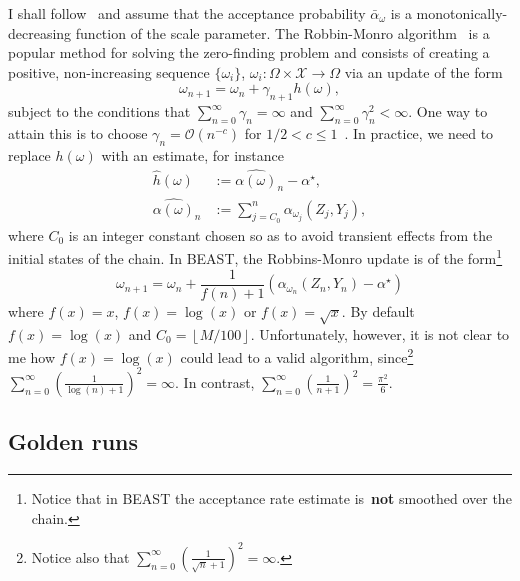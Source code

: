 I shall follow~\cite{Garthwaite2016} and assume that the acceptance probability $\bar{\alpha}_\omega$ is a monotonically-decreasing function of the scale parameter.
The Robbin-Monro algorithm~\citep{Robbins1951} is a popular method for solving the zero-finding problem and consists of creating a positive, non-increasing sequence $\{ \omega_i \}$, $\omega_i: \Omega \times \mathcal{X} \to \Omega$ via an update of the form~\cite[eq. 21]{Andrieu2008}
\begin{equation}
 \label{eq:general_size_update}
 \omega_{n + 1} = \omega_n + \gamma_{n + 1}h(\omega),
\end{equation}
subject to the conditions that $\sum_{n = 0}^\infty \gamma_n = \infty$ and $\sum_{n = 0}^\infty \gamma_n^2 < \infty$.
One way to attain this is to choose $\gamma_n = \mathcal{O}(n^{-c})$ for $1/2 < c \leq 1$~\citep{Atchade2005}.
In practice, we need to replace $h(\omega)$ with an estimate, for instance
\begin{align*}
\widehat{h}(\omega) &:=  \widehat{\alpha(\omega)}_n - \alpha^\star, \\
\widehat{\alpha(\omega)}_n &:= \sum_{j = C_0}^n  \alpha_{\omega_j}(Z_j, Y_j),
\end{align*}
where $C_0$ is an integer constant chosen so as to avoid transient effects from the initial states of the chain. 
In BEAST, the Robbins-Monro update is of the form\footnote{Notice that in BEAST the acceptance rate estimate is~\textbf{not} smoothed over the chain.}
\begin{equation}
 \label{eq:beast_size_update}
 \omega_{n + 1} = \omega_n + \frac{1}{f(n) + 1} \left( \alpha_{\omega_n}(Z_n, Y_n) - \alpha^\star\right)
\end{equation}
where $f(x) = x$, $f(x) = \log(x)$ or $f(x) = \sqrt{x}$.
By default $f(x) = \log(x)$ and $C_0 =  \left \lfloor{M/100}\right \rfloor$.
Unfortunately, however, it is not clear to me how $f(x) = \log(x)$ could lead to a valid algorithm, since\footnote{Notice also that $\sum_{n = 0}^\infty \left( \frac{1}{\sqrt{n} + 1}\right)^2 = \infty$.} $\sum_{n = 0}^\infty \left( \frac{1}{\log(n) + 1}\right)^2 = \infty$.
In contrast, $\sum_{n = 0}^\infty \left( \frac{1}{n + 1}\right)^2 = \frac{\pi^2}{6}$.

\subsection{Golden runs}
\label{sec:golden_runs}

